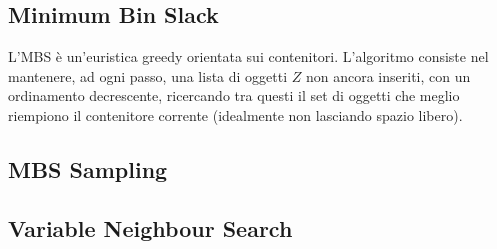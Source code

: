 \documentclass{article}
\begin{document}
\subsection{Minimum Bin Slack}
L'MBS è un'euristica greedy orientata sui contenitori. L'algoritmo consiste nel mantenere, ad ogni passo, una lista di oggetti $Z$ non ancora inseriti, con un ordinamento decrescente, ricercando tra questi il set di oggetti che meglio riempiono il contenitore corrente (idealmente non lasciando spazio libero).

\subsection{MBS Sampling}

\subsection{Variable Neighbour Search}



\end{document}
